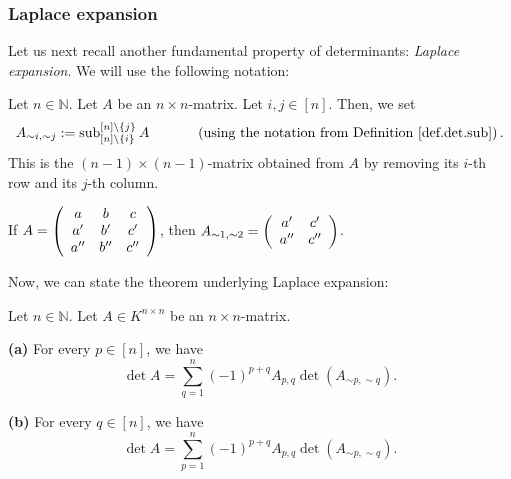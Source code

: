 \subsubsection{Laplace expansion}

Let us next recall another fundamental property of determinants: \emph{Laplace
expansion}. We will use the following notation:

\begin{convention}
\label{conv.mat.tilde}Let $n\in\mathbb{N}$. Let $A$ be an $n\times n$-matrix.
Let $i,j\in\left[  n\right]  $. Then, we set%
\[
A_{\sim i,\sim j}:=\operatorname*{sub}\nolimits_{\left[  n\right]
\setminus\left\{  i\right\}  }^{\left[  n\right]  \setminus\left\{  j\right\}
}A\ \ \ \ \ \ \ \ \ \ \left(  \text{using the notation from Definition
\ref{def.det.sub}}\right)  .
\]
This is the $\left(  n-1\right)  \times\left(  n-1\right)  $-matrix obtained
from $A$ by removing its $i$-th row and its $j$-th column.
\end{convention}

\begin{example}
If $A=\left(
\begin{array}
[c]{ccc}%
a & b & c\\
a^{\prime} & b^{\prime} & c^{\prime}\\
a^{\prime\prime} & b^{\prime\prime} & c^{\prime\prime}%
\end{array}
\right)  $, then $A_{\sim1,\sim2}=\left(
\begin{array}
[c]{cc}%
a^{\prime} & c^{\prime}\\
a^{\prime\prime} & c^{\prime\prime}%
\end{array}
\right)  $.
\end{example}

Now, we can state the theorem underlying Laplace expansion:

\begin{theorem}
\label{thm.det.laplace}Let $n\in\mathbb{N}$. Let $A\in K^{n\times n}$ be an
$n\times n$-matrix. \medskip

\textbf{(a)} For every $p\in\left[  n\right]  $, we have%
\[
\det A=\sum_{q=1}^{n}\left(  -1\right)  ^{p+q}A_{p,q}\det\left(  A_{\sim
p,\sim q}\right)  .
\]


\textbf{(b)} For every $q\in\left[  n\right]  $, we have%
\[
\det A=\sum_{p=1}^{n}\left(  -1\right)  ^{p+q}A_{p,q}\det\left(  A_{\sim
p,\sim q}\right)  .
\]

\end{theorem}

